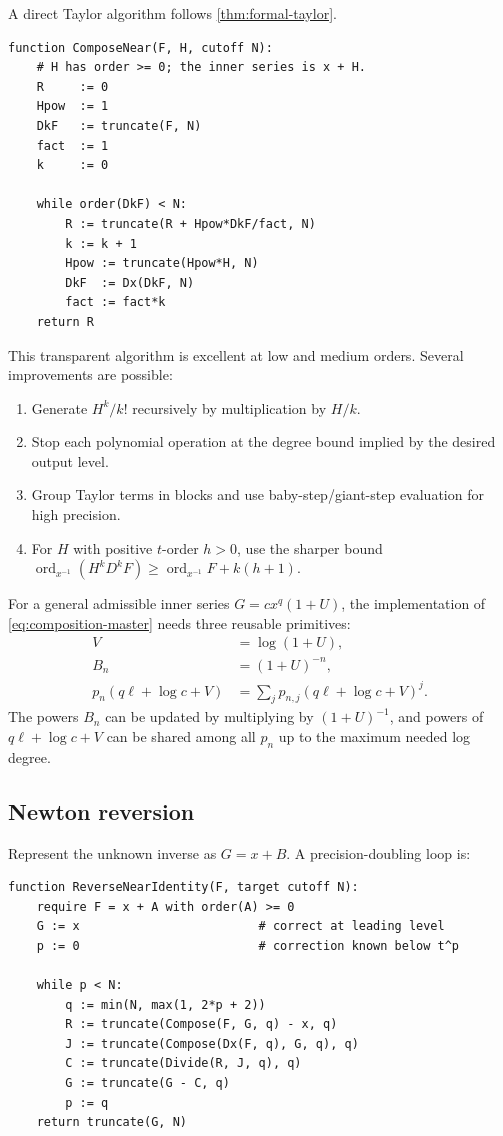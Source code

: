 \documentclass[11pt,oneside]{article}
\numberwithin{equation}{section}
\theoremstyle{definition}
\newcommand{\ordx}{\operatorname{ord}_{x^{-1}}}
\begin{document}
A direct Taylor algorithm follows \cref{thm:formal-taylor}.

\begin{lstlisting}[style=pseudocode,caption={Near-identity composition \(F\circ(x+H)\).}]
function ComposeNear(F, H, cutoff N):
    # H has order >= 0; the inner series is x + H.
    R     := 0
    Hpow  := 1
    DkF   := truncate(F, N)
    fact  := 1
    k     := 0

    while order(DkF) < N:
        R := truncate(R + Hpow*DkF/fact, N)
        k := k + 1
        Hpow := truncate(Hpow*H, N)
        DkF  := Dx(DkF, N)
        fact := fact*k
    return R
\end{lstlisting}

This transparent algorithm is excellent at low and medium orders.  Several
improvements are possible:
\begin{enumerate}
\item Generate \(H^k/k!\) recursively by multiplication by \(H/k\).
\item Stop each polynomial operation at the degree bound implied by the desired
  output level.
\item Group Taylor terms in blocks and use baby-step/giant-step evaluation for
  high precision.
\item For \(H\) with positive \(t\)-order \(h>0\), use the sharper bound
  \(\ordx(H^kD^kF)\ge\ordx F+k(h+1)\).
\end{enumerate}

For a general admissible inner series \(G=cx^q(1+U)\), the implementation of
\eqref{eq:composition-master} needs three reusable primitives:
\begin{align*}
  V&=\log(1+U),\\
  B_n&=(1+U)^{-n},\\
  p_n(q\ell+\log c+V)&=
    \sum_j p_{n,j}(q\ell+\log c+V)^j.
\end{align*}
The powers \(B_n\) can be updated by multiplying by \((1+U)^{-1}\), and powers
of \(q\ell+\log c+V\) can be shared among all \(p_n\) up to the maximum needed
log degree.

\subsection{Newton reversion}

Represent the unknown inverse as \(G=x+B\).  A precision-doubling loop is:

\begin{lstlisting}[style=pseudocode,caption={Newton series reversal in the PL ring.}]
function ReverseNearIdentity(F, target cutoff N):
    require F = x + A with order(A) >= 0
    G := x                         # correct at leading level
    p := 0                         # correction known below t^p

    while p < N:
        q := min(N, max(1, 2*p + 2))
        R := truncate(Compose(F, G, q) - x, q)
        J := truncate(Compose(Dx(F, q), G, q), q)
        C := truncate(Divide(R, J, q), q)
        G := truncate(G - C, q)
        p := q
    return truncate(G, N)
\end{lstlisting}
\end{document}
